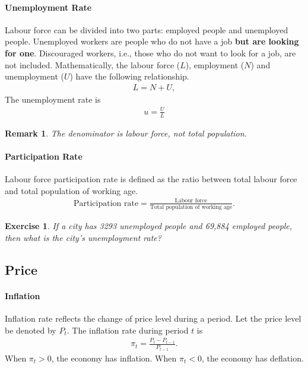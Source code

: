 \documentclass[12pt]{article}
\newtheorem*{remark}{Remark}
\newtheorem{exercise}{Exercise}
\numberwithin{equation}{section}
\begin{document}
\paragraph{Unemployment Rate}
Labour force can be divided into two parts: employed people and unemployed people. Unemployed workers are people who do not have a job \textbf{but are looking for one}. Discouraged workers, i.e., those who do not want to look for a job, are not included. Mathematically, the labour force ($L$), employment ($N$) and unemployment ($U$) have the following relationship.
\begin{align*}
    L = N + U,
\end{align*}
The unemployment rate is
\begin{align*}
    u=\frac{U}{L}
\end{align*}
\begin{remark}
    The denominator is labour force, not total population.
\end{remark}

\paragraph{Participation Rate}
Labour force participation rate is defined as the ratio between total labour force and total population of working age.
\begin{align*}
    \text{Participation rate} = \frac{\text{Labour force}}{\text{Total population of working age}}.
\end{align*}

\begin{exercise}
    If a city has 3293 unemployed people and 69,884 employed people, then what is the city's unemployment rate?
\end{exercise}

\subsection*{Price}
\paragraph{Inflation}
Inflation rate reflects the change of price level during a period. Let the price level be denoted by $P_t$. The inflation rate during period $t$ is
\begin{align*}
    \pi_t=\frac{P_t-P_{t-1}}{P_{t-1}}.
\end{align*}
When $\pi_t>0$, the economy has inflation. When $\pi_t<0$, the economy has deflation.
\end{document}
